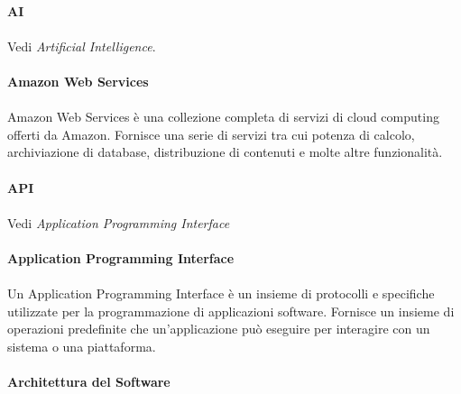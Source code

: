 \documentclass[10pt, a4paper]{article}
\begin{document}
\vspace{2em}
\paragraph{AI}\noindent\hrulefill 
\paragraph{}Vedi \textit{Artificial Intelligence\pg}.




\vspace{2em}
\paragraph{Amazon Web Services}\noindent\hrulefill
\paragraph{}Amazon Web Services è una collezione completa di servizi di cloud computing offerti da Amazon. Fornisce una serie di servizi tra cui potenza di calcolo, archiviazione di database, distribuzione di contenuti e molte altre funzionalità.

\vspace{2em}
\paragraph{API}\noindent\hrulefill
\paragraph{}Vedi \textit{Application Programming Interface\pg}

\vspace{2em}
\paragraph{Application Programming Interface}\noindent\hrulefill
\paragraph{}Un Application Programming Interface è un insieme di protocolli e specifiche utilizzate per la programmazione di applicazioni software. Fornisce un insieme di operazioni predefinite che un'applicazione può eseguire per interagire con un sistema o una piattaforma.

\vspace{2em}
\paragraph{Architettura del Software}\noindent\hrulefill
\end{document}
